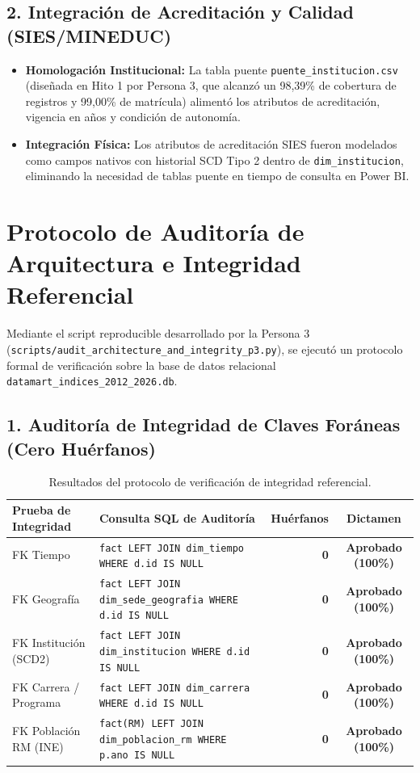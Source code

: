 \documentclass[11pt,a4paper]{article}
\begin{document}
\subsection{2. Integración de Acreditación y Calidad (SIES/MINEDUC)}
\begin{itemize}[leftmargin=*]
    \item \textbf{Homologación Institucional:} La tabla puente \texttt{puente\_institucion.csv} (diseñada en Hito 1 por Persona 3, que alcanzó un 98,39\% de cobertura de registros y 99,00\% de matrícula) alimentó los atributos de acreditación, vigencia en años y condición de autonomía.
    \item \textbf{Integración Física:} Los atributos de acreditación SIES fueron modelados como campos nativos con historial SCD Tipo 2 dentro de \texttt{dim\_institucion}, eliminando la necesidad de tablas puente en tiempo de consulta en Power BI.
\end{itemize}

\section{Protocolo de Auditoría de Arquitectura e Integridad Referencial}
\label{sec:auditoria}

Mediante el script reproducible desarrollado por la Persona 3 (\texttt{scripts/audit\_architecture\_and\_integrity\_p3.py}), se ejecutó un protocolo formal de verificación sobre la base de datos relacional \texttt{datamart\_indices\_2012\_2026.db}.

\subsection{1. Auditoría de Integridad de Claves Foráneas (Cero Huérfanos)}
\begin{table}[h!]
\centering
\small
\begin{tabular}{|l|l|r|c|}
\hline
\textbf{Prueba de Integridad} & \textbf{Consulta SQL de Auditoría} & \textbf{Huérfanos} & \textbf{Dictamen} \\
\hline
FK Tiempo & \texttt{fact LEFT JOIN dim\_tiempo WHERE d.id IS NULL} & \textbf{0} & \textbf{Aprobado (100\%)} \\
FK Geografía & \texttt{fact LEFT JOIN dim\_sede\_geografia WHERE d.id IS NULL} & \textbf{0} & \textbf{Aprobado (100\%)} \\
FK Institución (SCD2) & \texttt{fact LEFT JOIN dim\_institucion WHERE d.id IS NULL} & \textbf{0} & \textbf{Aprobado (100\%)} \\
FK Carrera / Programa & \texttt{fact LEFT JOIN dim\_carrera WHERE d.id IS NULL} & \textbf{0} & \textbf{Aprobado (100\%)} \\
FK Población RM (INE) & \texttt{fact(RM) LEFT JOIN dim\_poblacion\_rm WHERE p.ano IS NULL} & \textbf{0} & \textbf{Aprobado (100\%)} \\
\hline
\end{tabular}
\caption{Resultados del protocolo de verificación de integridad referencial.}
\label{tab:fk_audit}
\end{table}
\end{document}
